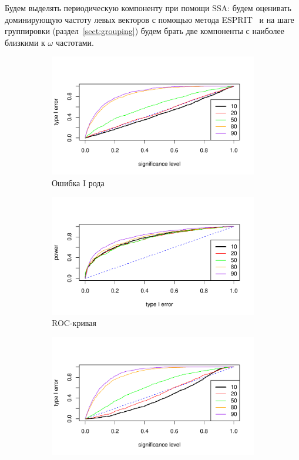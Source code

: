 \documentclass[specialist,
substylefile = spbu_report.rtx,
subf,href,colorlinks=true, 12pt]{disser}
\theoremstyle{definition}
\begin{document}
Будем выделять периодическую компоненту при помощи SSA: будем оценивать доминирующую частоту левых векторов с помощью метода \textsf{ESPRIT}~\cite[Раздел 3.1]{SSA_R} и на шаге группировки (раздел~\ref{sect:grouping}) будем брать две компоненты с наиболее близкими к $\omega$ частотами. 
\begin{figure}[h!]
	\captionsetup[subfigure]{justification=Centering}
	\begin{subfigure}[t]{0.5\textwidth}
		\centering
		\includegraphics[width=\textwidth]{img/type1error_sin.pdf}
		\caption{Ошибка I рода}
		\label{fig:sin_type1error}
	\end{subfigure}\hspace{\fill}
	\begin{subfigure}[t]{0.5\textwidth}
		\centering
		\includegraphics[width=\textwidth]{img/roc_sin.pdf}	
		\caption{ROC-кривая}
		\label{fig:sin_roc}
	\end{subfigure}
	\begin{subfigure}[t]{0.5\textwidth}
		\centering
		\includegraphics[width=\textwidth]{img/type1error_sin_est_noise.pdf}

\end{subfigure}
\end{figure}
\end{document}
